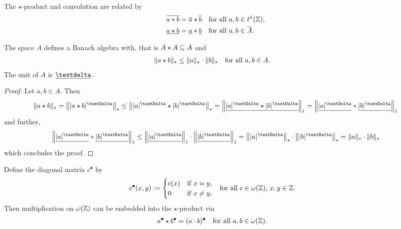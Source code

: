 \begin{lemma}
    The $\star$-product and convolution are related by
    \begin{subequations}
        \begin{align}
            \overline{ a \mathbin{*} b }
            &=
            \overline{a} \star \overline{b}
            &&\text{for all $ a, b \in \ell^{1}( \mathbb{ Z } ) $,}
            \\
            \underline{ a \star b }
            &=
            \underline{ a } \mathbin{*} \underline{ b }
            &&\text{for all $ a, b \in \overline{A} $.}
        \end{align}
    \end{subequations}
\end{lemma}

\begin{theorem}
    The space $ A $ defines a Banach algebra with,
    that is $ A \star A \subseteq A $ and
    \begin{align}
        \lVert  a \star b  \rVert_\star
        \leq
        \lVert  a  \rVert_\star \cdot \lVert  b  \rVert_\star
        &&&\text{for all $ a, b \in A $.}
    \end{align}
    The unit of $ A $ is $ \underline{\sfdeo} $.
\end{theorem}

\begin{proof}
    Let $ a, b \in A $.
    Then
    \begin{align*}
        \norm{ a \star b }_\star
        =
        \Norm{ \absDi{ a \star b } }_\star
        \leq
        \Norm{ \absDi{ a } \star \absDi{ b } }_\star
        =
        \Norm{ \underline{ \absDi{ a } \star \absDi{ b } } }_1
        =
        \Norm{ \underline{ \absDi{ a } } \conv
        \underline{ \absDi{ b } } }_1
    \end{align*}
    and further,
    \begin{align*}
        \Norm{ \underline{ \absDi{ a } } \conv
        \underline{ \absDi{ b } } }_1
        \leq
        \Norm{ \underline{ \absDi{ a } } }_1 \cdot
        \Norm{ \underline{ \absDi{ b } } }_1
        =
        \Norm{ \absDi{ a } }_\star \mult \Norm{ \absDi{ b } }_\star
        =
        \norm{ a }_\star \mult \norm{ b }_\star        
    \end{align*}
    which concludes the proof.
\end{proof}

Define the diagonal matrix $ c^\bullet $ by
\begin{align}
    c^\bullet( x, y )
    &:=
    \begin{cases}
        c( x )&\text{if $ x = y $,}
        \\
        0&\text{if $ x \neq y $,}
    \end{cases}
    &&\text{for all $ c \in \omega(\mathbb{ Z }) $, $ x, y \in \mathbb{ Z } $.}
\end{align}
Then multiplication on $ \omega(\mathbb{ Z }) $
can be embedded into the $\star$-product via
\begin{align}
    a^\bullet \star b^\bullet
    &=
    ( a \cdot b )^\bullet
    &&\text{for all $ a, b \in \omega(\mathbb{ Z }) $.}
\end{align}
